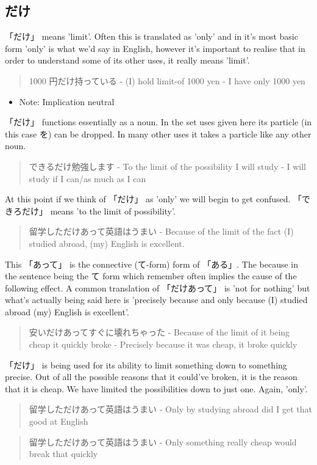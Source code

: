 \documentclass[11pt]{article}
\begin{document}
\subsection{だけ}
\label{sec:orgfe69908}
「だけ」 means 'limit'. Often this is translated as 'only' and in it's most basic form 'only' is what we'd say in English, however it's important to realise that in order to understand some of its other uses, it really means 'limit'.
\begin{quote}
1000 円だけ持っている - (I) hold limit-of 1000 yen - I have only 1000 yen
\end{quote}
\begin{itemize}
\item Note: Implication neutral
\end{itemize}
「だけ」 functions essentially as a noun. In the set uses given here its particle (in this case を) can be dropped. In many other uses it takes a particle like any other noun.

\begin{quote}
できるだけ勉強します - To the limit of the possibility I will study - I will study if I can/as much as I can
\end{quote}
At this point if we think of 「だけ」 as 'only' we will begin to get confused. 「できろだけ」 means 'to the limit of possibility'.

\begin{quote}
留学しただけあって英語はうまい - Because of the limit of the fact (I) studied abroad, (my) English is excellent.
\end{quote}
This 「あって」 is the connective (て-form) form of 「ある」. The because in the sentence being the て form which remember often implies the cause of the following effect. A common translation of 「だけあって」 is 'not for nothing' but what's actually being said here is 'precisely because and only because (I) studied abroad (my) English is excellent'.

\begin{quote}
安いだけあってすぐに壊れちゃった - Because of the limit of it being cheap it quickly broke - Precisely because it was cheap, it broke quickly
\end{quote}
「だけ」 is being used for its ability to limit something down to something precise. Out of all the possible reasons that it could've broken, it is the reason that it is cheap. We have limited the possibilities down to just one. Again, 'only'.
\begin{quote}
留学しただけあって英語はうまい - Only by studying abroad did I get that good at English
\end{quote}
\begin{quote}
留学しただけあって英語はうまい - Only something really cheap would break that quickly
\end{quote}
\end{document}
